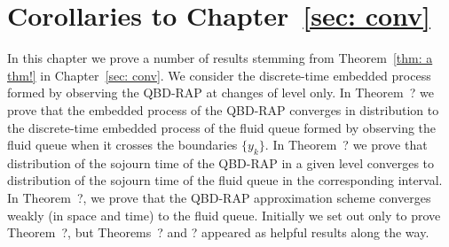 \chapter{Corollaries to Chapter~\ref{sec: conv}}\label{ch: global results}
In this chapter we prove a number of results stemming from Theorem~\ref{thm: a thm!} in Chapter~\ref{sec: conv}. We consider the discrete-time embedded process formed by observing the QBD-RAP at changes of level only. In Theorem~? we prove that the embedded process of the QBD-RAP converges in distribution to the discrete-time embedded process of the fluid queue formed by observing the fluid queue when it crosses the boundaries \(\{y_k\}\). In Theorem~? we prove that distribution of the sojourn time of the QBD-RAP in a given level converges to distribution of the sojourn time of the fluid queue in the corresponding interval. In Theorem~?, we prove that the QBD-RAP approximation scheme converges weakly (in space and time) to the fluid queue. Initially we set out only to prove Theorem~?, but Theorems~? and ? appeared as helpful results along the way. 


